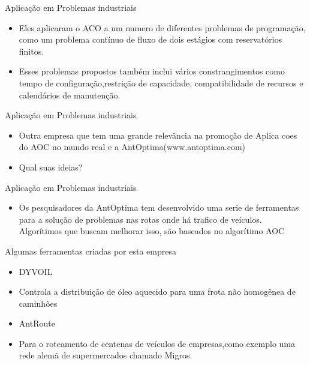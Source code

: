 \documentclass[compress]{beamer}
\begin{document}
\begin{frame}{Aplicação em Problemas industriais}
  \begin{itemize}
  \item {Eles aplicaram o ACO a um numero de diferentes problemas de programação, como um problema contínuo de fluxo de dois estágios com reservatórios finitos.}
  \newline
  \item{Esses problemas propostos também inclui vários constrangimentos como tempo de configuração,restrição de capacidade, compatibilidade de recursos e calendários de manutenção.}
  \end{itemize}
\end{frame}

\begin{frame}{Aplicação em Problemas industriais}
  \begin{itemize}
  \item {Outra empresa que tem uma grande relevância na promoção de Aplica coes do AOC no mundo real e a AntOptima(www.antoptima.com)}
  \newline
  \item{ Qual suas ideias? }
  \end{itemize}
\end{frame}

 \begin{frame}{Aplicação em Problemas industriais}
  \begin{itemize}
  \item {
Os pesquisadores da AntOptima tem desenvolvido uma serie de ferramentas para a solução de problemas nas rotas onde há trafico de veículos. Algorítimos que buscam melhorar isso, são baseados no algorítimo AOC
  }
  \end{itemize}
\end{frame}

\begin{frame}{Algumas ferramentas criadas por esta empresa}
  \begin{itemize}
  \item {DYVOIL}
  \newline
  \item{Controla a distribuição de óleo aquecido para uma frota não homogênea de caminhões}
  \newline
\item {AntRoute}
\newline
\item {Para o roteamento
de centenas de veículos de empresas,como exemplo uma rede alemã de supermercados chamado Migros.}
  \end{itemize}
\end{frame}
\end{document}
